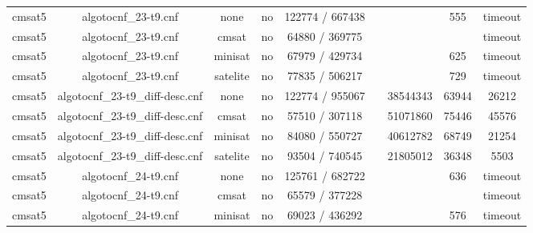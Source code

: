 \begin{appendices}
\begin{table}[p]
\begin{center}
\begin{tabular}{l|cccccccc}
  cmsat5                         & algotocnf\_23-t9.cnf           & none       & no    & 122774 / 667438 &           &           & 555        & timeout \\ %
  cmsat5                         & algotocnf\_23-t9.cnf           & cmsat      & no    & 64880 / 369775 &           &           &            & timeout \\ %
  cmsat5                         & algotocnf\_23-t9.cnf           & minisat    & no    & 67979 / 429734 &           &           & 625        & timeout \\ %
  cmsat5                         & algotocnf\_23-t9.cnf           & satelite   & no    & 77835 / 506217 &           &           & 729        & timeout \\ %
  cmsat5                         & algotocnf\_23-t9\_diff-desc.cnf & none       & no    & 122774 / 955067 &           & 38544343  & 63944      & 26212 \\ %
  cmsat5                         & algotocnf\_23-t9\_diff-desc.cnf & cmsat      & no    & 57510 / 307118 &           & 51071860  & 75446      & 45576 \\ %
  cmsat5                         & algotocnf\_23-t9\_diff-desc.cnf & minisat    & no    & 84080 / 550727 &           & 40612782  & 68749      & 21254 \\ %
  cmsat5                         & algotocnf\_23-t9\_diff-desc.cnf & satelite   & no    & 93504 / 740545 &           & 21805012  & 36348      & 5503 \\ %
  cmsat5                         & algotocnf\_24-t9.cnf           & none       & no    & 125761 / 682722 &           &           & 636        & timeout \\ %
  cmsat5                         & algotocnf\_24-t9.cnf           & cmsat      & no    & 65579 / 377228 &           &           &            & timeout \\ %
  cmsat5                         & algotocnf\_24-t9.cnf           & minisat    & no    & 69023 / 436292 &           &           & 576        & timeout \\ %

\end{tabular}
\end{center}
\end{table}
\end{appendices}
